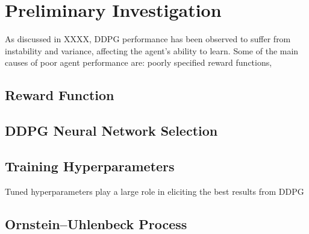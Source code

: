 \section{Preliminary Investigation}
As discussed in \textsection XXXX, DDPG performance has been observed to suffer from instability and variance,  affecting the agent's ability to learn. Some of the main causes of poor agent performance are: poorly specified reward functions, 


\subsection{Reward Function}


\subsection{DDPG Neural Network Selection}


\subsection{Training Hyperparameters}
Tuned hyperparameters play a large role in eliciting the best results from DDPG


\subsection{Ornstein–Uhlenbeck Process}

